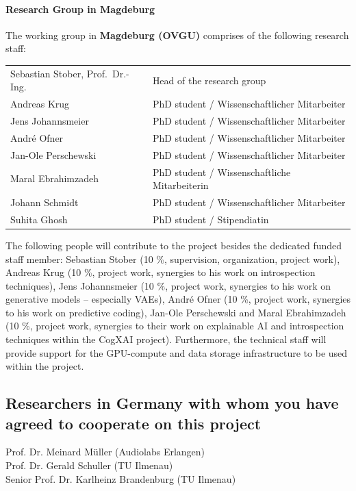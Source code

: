 \documentclass[11pt]{article}
\begin{document}
\paragraph{Research Group in Magdeburg}
The working group in \textbf{Magdeburg (OVGU)} comprises of the following research staff: 
\begin{table}[h!]
\begin{tabular}{ll}
Sebastian Stober, Prof.~Dr.-Ing.     &  Head of the research group \\
Andreas Krug        & PhD student / Wissenschaftlicher Mitarbeiter \\
Jens Johannsmeier   & PhD student / Wissenschaftlicher Mitarbeiter \\
André Ofner         & PhD student / Wissenschaftlicher Mitarbeiter \\
Jan-Ole Perschewski & PhD student / Wissenschaftlicher Mitarbeiter \\
Maral Ebrahimzadeh  & PhD student / Wissenschaftliche Mitarbeiterin \\
Johann Schmidt      & PhD student / Wissenschaftlicher Mitarbeiter \\
Suhita Ghosh        & PhD student / Stipendiatin \\
\end{tabular}
\end{table}

The following people will contribute to the project besides the dedicated funded staff member: 
Sebastian Stober (10 \%, supervision, organization, project work),
Andreas Krug (10 \%, project work, synergies to his work on introspection techniques),
Jens Johannsmeier (10 \%, project work, synergies to his work on generative models -- especially VAEs),
André Ofner (10 \%, project work, synergies to his work on predictive coding),
Jan-Ole Perschewski and Maral Ebrahimzadeh (10 \%, project work, synergies to their work on explainable AI and introspection techniques within the CogXAI project).
Furthermore, the technical staff will provide support for the GPU-compute and data storage infrastructure to be used within the project.

\subsection{Researchers in Germany with whom you have agreed to cooperate on this project}
Prof. Dr. Meinard Müller (Audiolabs Erlangen) \\ %
Prof. Dr. Gerald Schuller (TU Ilmenau) \\ %
Senior Prof. Dr. Karlheinz Brandenburg (TU Ilmenau) \\ %
\end{document}
